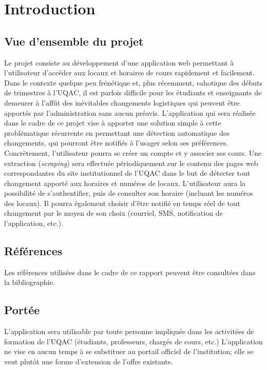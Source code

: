 \documentclass[12pt]{article}
\begin{document}
\newpage

\tableofcontents

\listoffigures

\listoftables

\newpage
    
\section{Introduction}

\subsection{Vue d'ensemble du projet}
Le projet consiste au développement d'une application web permettant à l'utilisateur d'accéder
aux locaux et horaires de cours rapidement et facilement.  Dans le contexte quelque peu frénétique et, plus récemment, cahotique des débuts de trimestres à l'UQAC, il est parfois difficile pour les étudiants et enseignants de demeurer à l'affût des inévitables changements logistiques qui peuvent être apportés par l'administration sans aucun préavis.  L'application qui sera réalisée dans le cadre de ce projet vise à apporter une solution simple à cette problématique récurrente en permettant une détection automatique des changements, qui pourront être notifiés à l'usager selon ses préférences.  \\

Concrètement, l'utilisateur pourra se créer un compte et y associer ses cours.  Une extraction (\textit{scraping}) sera effectuée périodiquement sur le contenu des pages web correspondantes du site institutionnel de l'UQAC dans le but de détecter tout changement apporté aux horaires et numéros de locaux.  L'utilisateur aura la possibilité de s'authentifier, puis de consulter son horaire (incluant les numéros des locaux).  Il pourra également choisir d'être notifié en temps réel de tout changement par le moyen de son choix (courriel, SMS, notification de l'application, etc.).

\subsection{Références}
Les références utilisées dans le cadre de ce rapport peuvent être consultées dans la bibliographie. 

\subsection{Portée}
L'application sera utilisable par toute personne impliquée dans les activitées de formation de l'UQAC (étudiants, professeurs, chargés de cours, etc.)  L'application ne vise en aucun temps à se substituer au portail officiel de l'institution; elle se veut plutôt une forme d'extension de l'offre existante. \\
\end{document}
